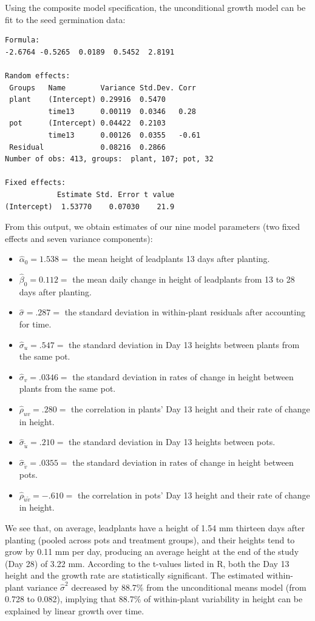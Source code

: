 \documentclass[
]{krantz}
\providecommand{\tightlist}{%
  \setlength{\itemsep}{0pt}\setlength{\parskip}{0pt}}
\begin{document}
Using the composite model specification, the unconditional growth model can be fit to the seed germination data:

\begin{verbatim}
Formula: 
-2.6764 -0.5265  0.0189  0.5452  2.8191 

Random effects:
 Groups   Name        Variance Std.Dev. Corr 
 plant    (Intercept) 0.29916  0.5470        
          time13      0.00119  0.0346   0.28 
 pot      (Intercept) 0.04422  0.2103        
          time13      0.00126  0.0355   -0.61
 Residual             0.08216  0.2866        
Number of obs: 413, groups:  plant, 107; pot, 32

Fixed effects:
            Estimate Std. Error t value
(Intercept)  1.53770    0.07030    21.9
\end{verbatim}

From this output, we obtain estimates of our nine model parameters (two fixed effects and seven variance components):

\begin{itemize}
\tightlist
\item
  \(\hat{\alpha}_{0}=1.538=\) the mean height of leadplants 13 days after planting.
\item
  \(\hat{\beta}_{0}=0.112=\) the mean daily change in height of leadplants from 13 to 28 days after planting.
\item
  \(\hat{\sigma}=.287=\) the standard deviation in within-plant residuals after accounting for time.
\item
  \(\hat{\sigma}_{u}=.547=\) the standard deviation in Day 13 heights between plants from the same pot.
\item
  \(\hat{\sigma}_{v}=.0346=\) the standard deviation in rates of change in height between plants from the same pot.
\item
  \(\hat{\rho}_{uv}=.280=\) the correlation in plants' Day 13 height and their rate of change in height.
\item
  \(\hat{\sigma}_{\tilde{u}}=.210=\) the standard deviation in Day 13 heights between pots.
\item
  \(\hat{\sigma}_{\tilde{v}}=.0355=\) the standard deviation in rates of change in height between pots.
\item
  \(\hat{\rho}_{\tilde{u}\tilde{v}}=-.610=\) the correlation in pots' Day 13 height and their rate of change in height.
\end{itemize}

We see that, on average, leadplants have a height of 1.54 mm thirteen days after planting (pooled across pots and treatment groups), and their heights tend to grow by 0.11 mm per day, producing an average height at the end of the study (Day 28) of 3.22 mm. According to the t-values listed in R, both the Day 13 height and the growth rate are statistically significant. The estimated within-plant variance \(\hat{\sigma}^2\) decreased by 88.7\% from the unconditional means model (from 0.728 to 0.082), implying that 88.7\% of within-plant variability in height can be explained by linear growth over time.
\end{document}
